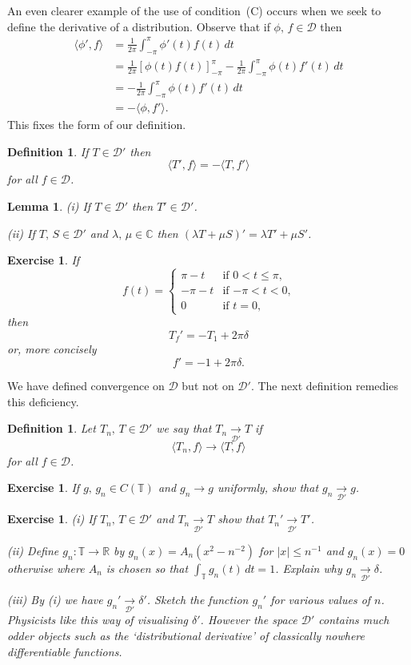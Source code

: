 \documentclass[12pt]{article}
\newtheorem{lemma}[theorem]{Lemma}
\newtheorem{definition}[theorem]{Definition}
\newtheorem{exercise}[theorem]{Exercise}
\theoremstyle{definition}
\newcommand{\arrowd}{\underset{{\mathcal D}'}{\rightarrow}}
\begin{document}
An even clearer example of the use of condition~(C) occurs
when we seek to define the derivative of a distribution.
Observe that if $\phi,\,f\in{\mathcal D}$ then
\begin{align*}
\langle \phi',f\rangle&
=\frac{1}{2\pi}\int_{-\pi}^{\pi}\phi'(t)f(t)\,dt\\
&=\frac{1}{2\pi}\left[\phi(t)f(t)\right]_{-\pi}^{\pi}
-\frac{1}{2\pi}\int_{-\pi}^{\pi}\phi(t)f'(t)\,dt\\
&=-\frac{1}{2\pi}\int_{-\pi}^{\pi}\phi(t)f'(t)\,dt\\
&=-\langle \phi,f'\rangle.
\end{align*}
This fixes the form of our definition.
\begin{definition} If $T\in{\mathcal D}'$ then
\[\langle T',f\rangle=-\langle T,f'\rangle\]
for all $f\in{\mathcal D}$.
\end{definition}
\begin{lemma} (i)
If $T\in{\mathcal D}'$ then $T'\in{\mathcal D}'$.

(ii) If $T,\,S\in{\mathcal D}'$ and $\lambda,\,\mu\in{\mathbb C}$
then $(\lambda T+\mu S)'=\lambda T'+\mu S'$.
\end{lemma}
\begin{exercise}
If
\begin{equation*}
f(t)=
\begin{cases}
\pi-t&\text{if $0<t\leq \pi$,}\\
-\pi-t&\text{if $-\pi<t<0$,}\\
0&\text{if $t=0$,}
\end{cases}
\end{equation*}
then
\[T_{f}'=-T_{1}+2\pi \delta\]
or, more concisely
\[f'=-1+2\pi \delta.\]
\end{exercise}

We have defined convergence on ${\mathcal D}$ but not on
${\mathcal D}'$. The next definition remedies this deficiency.
\begin{definition} Let $T_{n},\,T\in{\mathcal D}'$
we say that $T_{n}\arrowd T$ if
\[\langle T_{n},f\rangle\rightarrow \langle T,f\rangle\]
for all $f\in{\mathcal D}$.
\end{definition}
\begin{exercise} If $g,\,g_{n}\in C({\mathbb T})$ and
$g_{n}\rightarrow g$ uniformly, show that
$g_{n}\arrowd g$.
\end{exercise}
\begin{exercise} (i) If $T_{n},\,T\in{\mathcal D}'$
and $T_{n}\arrowd T$ show that $T_{n}'\arrowd T'$.

(ii) Define $g_{n}:{\mathbb T}\rightarrow{\mathbb R}$
by $g_{n}(x)=A_{n}(x^{2}-n^{-2})$ for $|x|\leq n^{-1}$
and $g_{n}(x)=0$ otherwise where $A_{n}$ is chosen so that
$\int_{\mathbb T}g_{n}(t)\,dt=1$. Explain why
$g_{n}\arrowd \delta$.

(iii) By (i) we have $g_{n}'\arrowd \delta'$.
Sketch the function $g_{n}'$ for various values of $n$.
Physicists like this way of visualising $\delta'$.
However the space ${\mathcal D}'$ contains much
odder objects such as the `distributional derivative'
of classically nowhere differentiable functions.
\end{exercise}
\end{document}
